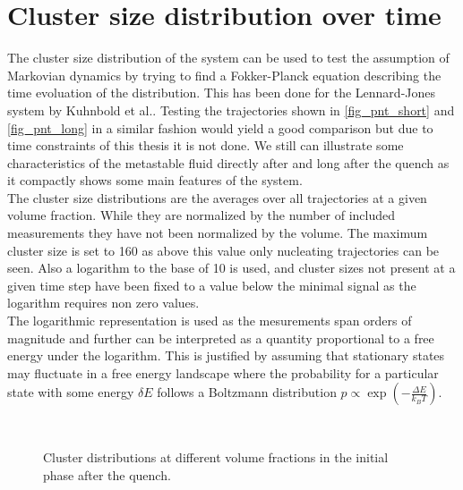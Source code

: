 \section{Cluster size distribution over time}
\label{sec:pnt}
The cluster size distribution of the system can be used to test the assumption of Markovian dynamics by trying to find a Fokker-Planck equation describing the time evoluation of the distribution. This has been done for the Lennard-Jones system by Kuhnbold et al.\cite{Kuhnbold2019}. Testing the trajectories shown in \autoref{fig_pnt_short} and \autoref{fig_pnt_long} in a similar fashion would yield a good comparison but due to time constraints of this thesis it is not done. We still can illustrate some characteristics of the metastable fluid directly after and long after the quench as it compactly shows some main features of the system.\\ 

The cluster size distributions are the averages over all trajectories at a given volume fraction. While they are normalized by the number of included measurements they have not been normalized by the volume. The maximum cluster size is set to 160 as above this value only nucleating trajectories can be seen. Also a logarithm to the base of 10 is used, and cluster sizes not present at a given time step have been fixed to a value below the minimal signal as the logarithm requires non zero values.\\
The logarithmic representation is used as the mesurements span orders of magnitude and further can be interpreted as a quantity proportional to a free energy under the logarithm. This is justified by assuming that stationary states may fluctuate in a free energy landscape where the probability for a particular state with some energy $\delta E$ follows a Boltzmann distribution $p\propto \exp \left( - \frac{\Delta E}{k_B T} \right)$.\\

\begin{figure}[ht]
\begin{center}
 \hspace{0.0cm}
\\
 \hspace{0.0cm}
\caption[Cluster size distributions over time after quench]{Cluster distributions at different volume fractions in the initial phase after the quench.}
\label{fig:pnt_short}
\end{center}
\end{figure}

